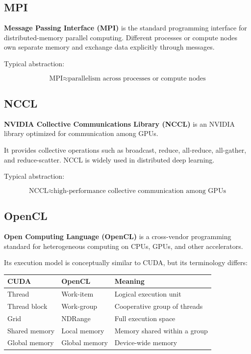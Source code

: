 \documentclass[11pt,a4paper]{article}
\begin{document}
\subsection{MPI}

\textbf{Message Passing Interface (MPI)} is the standard programming interface for distributed-memory parallel computing. Different processes or compute nodes own separate memory and exchange data explicitly through messages.

Typical abstraction:

\[
\boxed{\text{MPI} \approx \text{parallelism across processes or compute nodes}}
\]

\subsection{NCCL}

\textbf{NVIDIA Collective Communications Library (NCCL)} is an NVIDIA library optimized for communication among GPUs.

It provides collective operations such as broadcast, reduce, all-reduce, all-gather, and reduce-scatter. NCCL is widely used in distributed deep learning.

Typical abstraction:

\[
\boxed{\text{NCCL} \approx \text{high-performance collective communication among GPUs}}
\]

\subsection{OpenCL}

\textbf{Open Computing Language (OpenCL)} is a cross-vendor programming standard for heterogeneous computing on CPUs, GPUs, and other accelerators.

Its execution model is conceptually similar to CUDA, but its terminology differs:

\begin{center}
\begin{tabular}{lll}
\toprule
CUDA & OpenCL & Meaning \\
\midrule
Thread & Work-item & Logical execution unit \\
Thread block & Work-group & Cooperative group of threads \\
Grid & NDRange & Full execution space \\
Shared memory & Local memory & Memory shared within a group \\
Global memory & Global memory & Device-wide memory \\
\bottomrule
\end{tabular}
\end{center}
\end{document}
